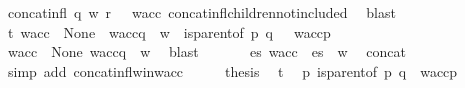 \begin{isabellebody}
\ {\isacartoucheopen}concat{\isacharunderscore}{\kern0pt}infl\ q\ w\ {\isacharparenleft}{\kern0pt}r\ {\isacharhash}{\kern0pt}\ {\isasymepsilon}{\isacharparenright}{\kern0pt}\ w{\isacharunderscore}{\kern0pt}acc{\isacartoucheclose}\ concat{\isacharunderscore}{\kern0pt}infl{\isacharunderscore}{\kern0pt}children{\isacharunderscore}{\kern0pt}not{\isacharunderscore}{\kern0pt}included\ \isamarkupfalse%
\ blast\isanewline
\ \ \isamarkupfalse%
\ \isamarkupfalse%
\ t{}{\isacharcolon}{\kern0pt}\ {\isachardoublequoteopen}w{\isacharunderscore}{\kern0pt}acc\ {\isasymin}\ {\isasymT}\isactrlbsub None\isactrlesub \ {\isasymand}\ w{\isacharunderscore}{\kern0pt}acc{\isasymdown}\isactrlsub q\ {\isacharequal}{\kern0pt}\ w\ {\isasymand}\ {\isacharparenleft}{\kern0pt}{\isacharparenleft}{\kern0pt}is{\isacharunderscore}{\kern0pt}parent{\isacharunderscore}{\kern0pt}of\ p\ q{\isacharparenright}{\kern0pt}\ {\isasymlongrightarrow}\ \ w{\isacharunderscore}{\kern0pt}acc{\isasymdown}\isactrlsub p\ {\isacharequal}{\kern0pt}\ {\isasymepsilon}{\isacharparenright}{\kern0pt}{\isachardoublequoteclose}\ \isamarkupfalse%
\ {\isacartoucheopen}w{\isacharunderscore}{\kern0pt}acc\ {\isasymin}\ {\isasymT}\isactrlbsub None\isactrlesub {\isacartoucheclose}\ {\isacartoucheopen}w{\isacharunderscore}{\kern0pt}acc{\isasymdown}\isactrlsub q\ {\isacharequal}{\kern0pt}\ w{\isacartoucheclose}\ \isamarkupfalse%
\ blast\ \ \isanewline
\ \ \isamarkupfalse%
\ {\isachardoublequoteopen}{\isasymexists}\ es{\isachardot}{\kern0pt}\ w{\isacharunderscore}{\kern0pt}acc\ {\isacharequal}{\kern0pt}\ es\ {\isacharat}{\kern0pt}\ w{\isachardoublequoteclose}\ \isamarkupfalse%
\ concat\ \isamarkupfalse%
\ {\isacharparenleft}{\kern0pt}simp\ add{\isacharcolon}{\kern0pt}\ concat{\isacharunderscore}{\kern0pt}infl{\isacharunderscore}{\kern0pt}w{\isacharunderscore}{\kern0pt}in{\isacharunderscore}{\kern0pt}w{\isacharunderscore}{\kern0pt}acc{\isacharparenright}{\kern0pt}\isanewline
\ \ \isamarkupfalse%
\ \isamarkupfalse%
\ {\isacharquery}{\kern0pt}thesis\ \isamarkupfalse%
\ t{}\ \isamarkupfalse%
\ {\isacartoucheopen}{\isasymforall}p{\isachardot}{\kern0pt}\ is{\isacharunderscore}{\kern0pt}parent{\isacharunderscore}{\kern0pt}of\ p\ q\ {\isasymlongrightarrow}\ w{\isacharunderscore}{\kern0pt}acc{\isasymdown}\isactrlsub p\ {\isacharequal}{\kern0pt}\ {\isasymepsilon}{\isacartoucheclose}\ \isamarkupfalse%

\end{isabellebody}
